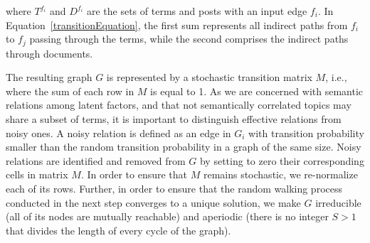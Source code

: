 \noindent where $T^{f_i}$ and $D^{f_i}$ are the sets of terms and posts with an input edge $f_i$. In Equation~\ref{transitionEquation},
the first sum represents all indirect paths from $f_i$ to $f_j$ passing through the terms, while the second comprises the indirect paths through documents.

The resulting graph $G$ is represented by a stochastic transition matrix $M$,
i.e., where the sum of each row in $M$ is equal to 1. As we are concerned
with semantic relations among latent factors, and that not semantically
correlated topics may share a subset of terms, it is important to distinguish
effective relations from noisy ones. A noisy relation is defined as an edge in
$G_i$ with transition probability smaller than the random transition
probability in a graph of the same size. Noisy relations are identified and
removed from $G$ by setting to zero their corresponding cells in matrix $M$. In
order to ensure that $M$ remains stochastic, we re-normalize each of its rows.
Further, in order to ensure that the random walking process conducted in the
next step converges to a unique solution, we make $G$ irreducible (all of its nodes are mutually reachable)
and aperiodic (there is no integer $S > 1$ that divides the length of every cycle of the graph). 


